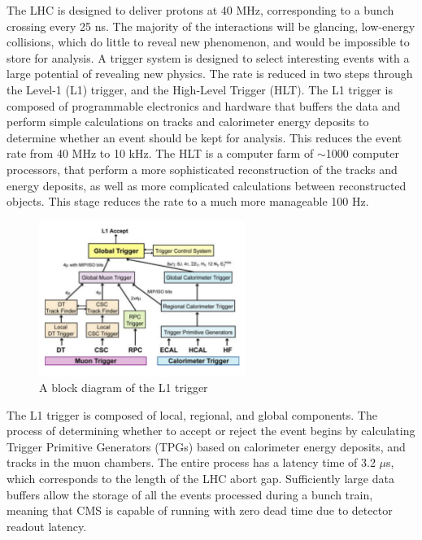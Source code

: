 \par The LHC is designed to deliver protons at 40 MHz, corresponding
to a bunch crossing every 25 ns.  The majority of the interactions will
be glancing, low-energy collisions, which do little to reveal new
phenomenon, and would be impossible to store for analysis.  A trigger
system is designed to select interesting events with a large potential
of revealing new physics.  The rate is reduced in two steps through
the Level-1 (L1) trigger, and the High-Level Trigger (HLT).  The L1
trigger is composed of programmable electronics and hardware that
buffers the data and perform simple calculations on tracks and
calorimeter energy deposits to determine whether an event should be
kept for analysis.  This reduces the event rate from 40 MHz to 10
kHz.  The HLT is a computer farm of $\sim$1000 computer processors,
that perform a more sophisticated reconstruction of the tracks and
energy deposits, as well as more complicated calculations between
reconstructed objects.  This stage reduces the rate to a much more
manageable 100 Hz.    

\begin{figure}[h]
   \centering
  \includegraphics[width=0.6\textwidth]{Figures/CMS_Diagrams/Trigger__L1_layout.pdf}
  \caption{A block diagram of the L1 trigger}\label{fig:tigger_L1_layout}
\end{figure}

\par The L1 trigger is composed of local, regional, and global
components.  The process of determining whether to accept or reject
the event begins by calculating Trigger Primitive Generators (TPGs)
based on calorimeter energy deposits, and tracks in the muon
chambers.  The entire process has a latency time of 3.2 $\mu$s, which
corresponds to the length of the LHC abort gap.  Sufficiently large
data buffers allow the storage of all the events processed during a
bunch train, meaning that CMS is capable of running with zero dead
time due to detector readout latency.  


